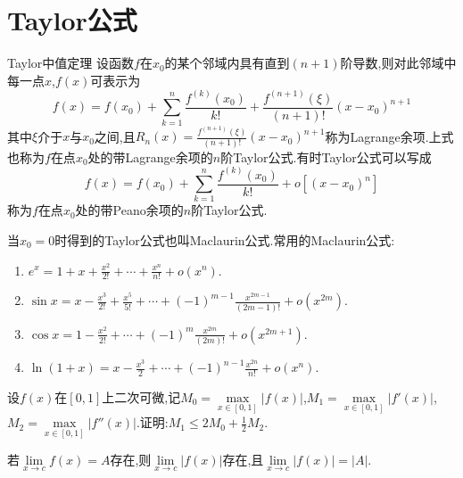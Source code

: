 \chapter{Taylor公式}

\begin{theorem}{Taylor中值定理}
	设函数$f$在$x_0$的某个邻域内具有直到$(n+1)$阶导数,则对此邻域中每一点$x$,$f\left( x \right) $可表示为
	$$
		f\left( x \right) =f\left( x_0 \right) +\sum_{k=1}^n{\frac{f^{\left( k \right)}\left( x_0 \right)}{k!}}+\frac{f^{\left( n+1 \right)}\left( \xi \right)}{\left( n+1 \right) !}\left( x-x_0 \right) ^{n+1}
	$$
	其中$\xi $介于$x$与$x_0$之间,且$R_n\left( x \right) =\frac{f^{\left( n+1 \right)}\left( \xi \right)}{\left( n+1 \right) !}\left( x-x_0 \right) ^{n+1}$称为Lagrange余项.上式也称为$f$在点$x_0$处的带Lagrange余项的$n$阶Taylor公式.有时Taylor公式可以写成
	$$
		f\left( x \right) =f\left( x_0 \right) +\sum_{k=1}^n{\frac{f^{\left( k \right)}\left( x_0 \right)}{k!}}+o\left[ \left( x-x_0 \right) ^n \right]
	$$
	称为$f$在点$x_0$处的带Peano余项的$n$阶Taylor公式.
\end{theorem}

\begin{note}
	当$x_0=0$时得到的Taylor公式也叫Maclaurin公式.常用的Maclaurin公式:
	\begin{enumerate}
		\item $e^x=1+x+\frac{x^2}{2!}+\cdots +\frac{x^n}{n!}+o\left( x^n \right) $.
		\item $\sin x=x-\frac{x^3}{2!}+\frac{x^5}{5!}+\cdots +\left( -1 \right) ^{m-1}\frac{x^{2m-1}}{\left( 2m-1 \right) !}+o\left( x^{2m} \right) $.
		\item $\cos x=1-\frac{x^2}{2!}+\cdots +\left( -1 \right) ^m\frac{x^{2m}}{\left( 2m \right) !}+o\left( x^{2m+1} \right) $.
		\item $\ln \left( 1+x \right) =x-\frac{x^3}{2}+\cdots +\left( -1 \right) ^{n-1}\frac{x^{2n}}{n!}+o\left( x^{n} \right)$.
	\end{enumerate}
\end{note}

\begin{example}
	设$f\left( x\right) $在$\left[ 0,1 \right] $上二次可微,记$M_0=\underset{x\in \left[ 0,1 \right]}{\max}\left| f\left( x \right) \right|$,$M_1=\underset{x\in \left[ 0,1 \right]}{\max}\left| f'\left( x \right) \right|$,$M_2=\underset{x\in \left[ 0,1 \right]}{\max}\left| f''\left( x \right) \right| $.证明:$M_1\le 2M_0+\frac{1}{2}M_2$.
\end{example}

\begin{note}
	若$\lim\limits_{x\rightarrow c}f\left( x \right) =A$存在,则$\lim\limits_{x\rightarrow c}\left| f\left( x \right) \right|$存在,且$\lim\limits_{x\rightarrow c}\left| f\left( x \right) \right|=\left| A \right|$.
	\vspace{7cm}
\end{note}

